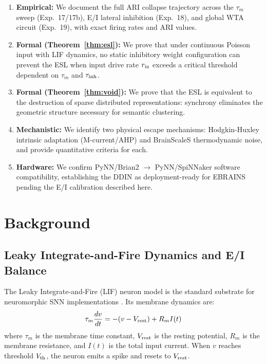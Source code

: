 \documentclass{article}
\begin{document}
\begin{enumerate}
  \item \textbf{Empirical:} We document the full ARI collapse trajectory across the $\tau_m$ sweep (Exp.~17/17b), E/I lateral inhibition (Exp.~18), and global WTA circuit (Exp.~19), with exact firing rates and ARI values.
  \item \textbf{Formal (Theorem~\ref{thm:esl}):} We prove that under continuous Poisson input with LIF dynamics, no static inhibitory weight configuration can prevent the ESL when input drive rate $r_{\rm in}$ exceeds a critical threshold dependent on $\tau_m$ and $\tau_{\rm inh}$.
  \item \textbf{Formal (Theorem~\ref{thm:void}):} We prove that the ESL is equivalent to the destruction of sparse distributed representations: synchrony eliminates the geometric structure necessary for semantic clustering.
  \item \textbf{Mechanistic:} We identify two physical escape mechanisms: Hodgkin-Huxley intrinsic adaptation (M-current/AHP) and BrainScaleS thermodynamic noise, and provide quantitative criteria for each.
  \item \textbf{Hardware:} We confirm PyNN/Brian2 $\to$ PyNN/SpiNNaker software compatibility, establishing the DDIN as deployment-ready for EBRAINS pending the E/I calibration described here.
\end{enumerate}

\section{Background}

\subsection{Leaky Integrate-and-Fire Dynamics and E/I Balance}

The Leaky Integrate-and-Fire (LIF) neuron model is the standard substrate for neuromorphic SNN implementations \citep{gerstner2002}. Its membrane dynamics are:
\begin{equation}
\tau_m \frac{dv}{dt} = -(v - V_{\rm rest}) + R_m I(t)
\label{eq:lif}
\end{equation}
where $\tau_m$ is the membrane time constant, $V_{\rm rest}$ is the resting potential, $R_m$ is the membrane resistance, and $I(t)$ is the total input current. When $v$ reaches threshold $V_{\rm th}$, the neuron emits a spike and resets to $V_{\rm rest}$.
\end{document}
